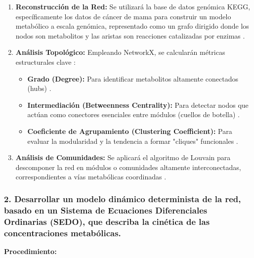 \documentclass[12pt,spanish]{article}
\newcommand{\procedimiento}{\textbf{Procedimiento:}}
\begin{document}
	\begin{enumerate}
		\item \textbf{Reconstrucción de la Red:} Se utilizará la base de datos genómica KEGG, específicamente los datos de cáncer de mama para construir un modelo metabólico a escala genómica, representado como un grafo dirigido donde los nodos son metabolitos y las aristas son reacciones catalizadas por enzimas \cite{brunk2018, caspi2020}.
		
		\item \textbf{Análisis Topológico:} Empleando NetworkX, se calcularán métricas estructurales clave \cite{hagberg2008, shannon2003}:
		\begin{itemize}
			\item \textbf{Grado (Degree):} Para identificar metabolitos altamente conectados (hubs) \cite{Barabasi2004}.
			\item \textbf{Intermediación (Betweenness Centrality):} Para detectar nodos que actúan como conectores esenciales entre módulos (cuellos de botella) \cite{joy2005}.
			\item \textbf{Coeficiente de Agrupamiento (Clustering Coefficient):} Para evaluar la modularidad y la tendencia a formar "cliques" funcionales \cite{watts1998}.
		\end{itemize}
		
		\item \textbf{Análisis de Comunidades:} Se aplicará el algoritmo de Louvain para descomponer la red en módulos o comunidades altamente interconectadas, correspondientes a vías metabólicas coordinadas \cite{blondel2008}.
	\end{enumerate}
	
	\subsubsection*{2. Desarrollar un modelo dinámico determinista de la red, basado en un Sistema de Ecuaciones Diferenciales Ordinarias (SEDO), que describa la cinética de las concentraciones metabólicas.}
	
	\procedimiento
	
\end{document}
